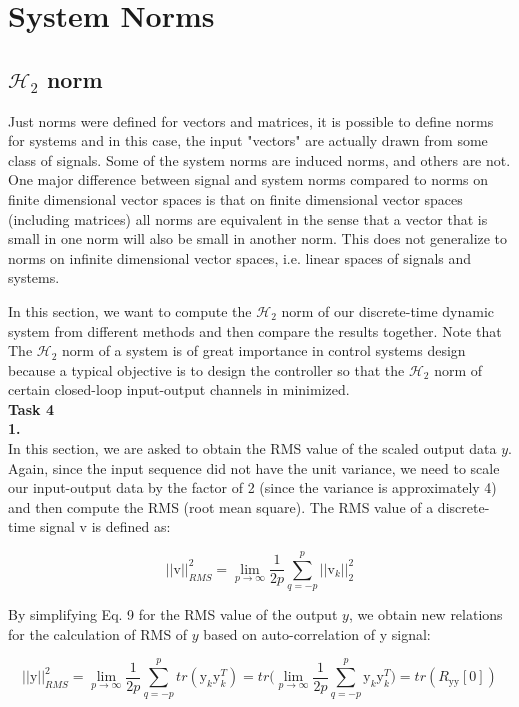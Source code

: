 \documentclass[paper=US leter, fontsize=11pt]{scrartcl}
\begin{document}
\section{System Norms}
\subsection{ $\mathcal{H}_{2}$ norm}
Just norms were defined for vectors and matrices, it is possible to define norms for systems and in this case,
the input "vectors" are actually drawn from some class of signals. Some of the system norms are induced
norms, and others are not. One major difference between signal and system norms compared to norms on finite dimensional vector spaces is that on finite dimensional vector spaces (including matrices) all norms
are equivalent in the sense that a vector that is small in one norm will also be small in another norm. This
does not generalize to norms on infinite dimensional vector spaces, i.e. linear spaces of signals and systems.

In this section, we want to compute the $\mathcal{H}_{2}$ norm of our discrete-time dynamic system from different methods and then compare the results together. Note that The $\mathcal{H}_{2}$ norm of a system is of great importance in control systems design because a typical objective is to design the controller so that the  $\mathcal{H}_{2}$ norm of certain closed-loop input-output channels in minimized.\\

\vspace{10pt}
\textbf{Task 4}\\
\textbf{1.}\\
In this section, we are asked to obtain the RMS value of the scaled output data $y$. Again, since the input sequence did not have the unit variance, we need to scale our input-output data by the factor of 2 (since the variance is approximately 4) and then compute the RMS (root mean square). The RMS value of a discrete-time signal v is defined as: 

\begin{equation}
||\text{v}||_{RMS}^{2} = \lim\limits_{p \to \infty}\frac{1}{2p}\sum_{q=-p}^{p} ||\text{v}_{k}||^{2}_{2}
\tag{9}
\end{equation} 

By simplifying Eq. 9 for the RMS value of the output $y$, we obtain new relations for the calculation of RMS of $y$ based on auto-correlation of y signal:

\begin{equation}
||\text{y}||_{RMS}^{2} = \lim\limits_{p \to \infty}\frac{1}{2p}\sum_{q=-p}^{p} tr(\text{y}_{k}\text{y}_{k}^{T})=tr\bigg(\lim\limits_{p \to \infty}\frac{1}{2p}\sum_{q=-p}^{p} \text{y}_{k}\text{y}_{k}^{T}\bigg) = tr(R_{\text{y}\text{y}}[0])
\tag{10}
\end{equation}
 
\end{document}
